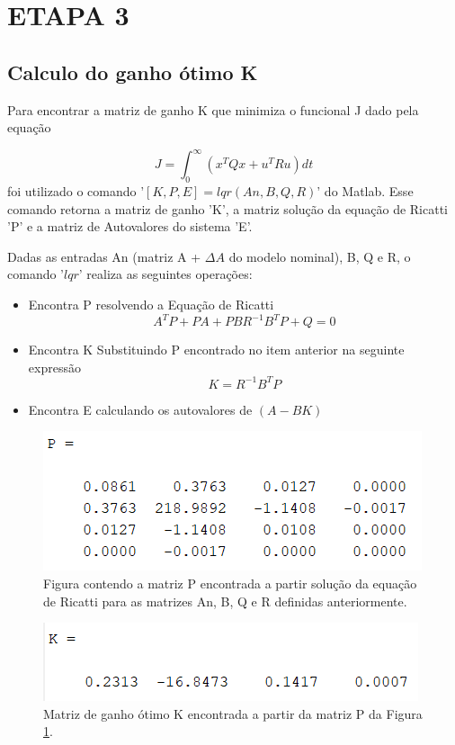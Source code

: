 \documentclass[a4paper,12pt]{article}
\begin{document}
\newpage

\section{ETAPA 3}
\subsection{Calculo do ganho ótimo K}
\label{subsec:GanhoK}

Para encontrar a matriz de ganho K que minimiza o funcional J dado pela equação 

$$ J = \int_{0}^{\infty} \left( x^T Q x + u^T R u\right) dt $$
foi utilizado o comando '$[K,P,E]=lqr(An,B,Q,R)$' do Matlab. Esse comando retorna a matriz de ganho 'K', a matriz solução da equação de Ricatti 'P' e a matriz de Autovalores do sistema 'E'.

Dadas as entradas An (matriz A + $\Delta A$ do modelo nominal), B, Q e R, o comando '$lqr$' realiza as seguintes operações:
\begin{itemize}
    \item Encontra P resolvendo a Equação de Ricatti
    $$ A^T P + PA + PBR^{-1}B^TP + Q = 0$$
    \item Encontra K Substituindo P encontrado no item anterior na seguinte expressão
    $$ K = R^{-1}B^TP $$
    \item Encontra E calculando os autovalores de $\left(A-BK\right)$
\end{itemize}

\begin{figure}[!h]
  \hspace*{-1cm} 
  \includegraphics[width=8 cm]{PRicatti.png}
  \centering
  \caption{Figura contendo a matriz P encontrada a partir solução da equação de Ricatti para as matrizes An, B, Q e R definidas anteriormente.}
  \label{PRiccati}
\end{figure}
\clearpage
\begin{figure}[!h]
  \hspace*{-1cm} 
  \includegraphics[width=8 cm]{MatrizganhoK.png}
  \centering
  \caption{Matriz de ganho ótimo K encontrada a partir da matriz P da Figura \ref{PRiccati}.}
  \label{GanhoK}
\end{figure}
\end{document}
